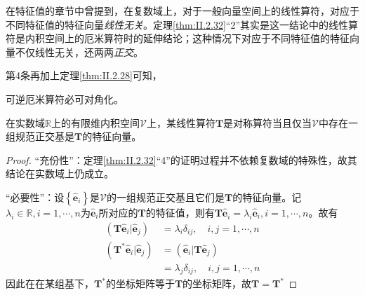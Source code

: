 \documentclass[main.tex]{subfiles}
\begin{document}
在特征值的章节中曾提到，在复数域上，对于一般向量空间上的线性算符，对应于不同特征值的特征向量\emph{线性无关}。定理\ref{thm:II.2.32}“2”其实是这一结论中的线性算符是内积空间上的厄米算符时的延伸结论；这种情况下对应于不同特征值的特征向量不仅线性无关，还两两\emph{正交}。

第4条再加上定理\ref{thm:II.2.28}可知，

\begin{corollary}可逆厄米算符必可对角化。\end{corollary}

\begin{corollary}
    在实数域$\mathbb{R}$上的有限维内积空间$\mathcal{V}$上，某线性算符$\mathbf{T}$是对称算符当且仅当$\mathcal{V}$中存在一组规范正交基是$\mathbf{T}$的特征向量。
\end{corollary}
\begin{proof}
    “充份性”：定理\ref{thm:II.2.32}“4”的证明过程并不依赖复数域的特殊性，故其结论在实数域上仍成立。

    “必要性”：设$\left\{\mathbf{\hat{e}}_i\right\}$是$\mathcal{V}$的一组规范正交基且它们是$\mathbf{T}$的特征向量。记$\lambda_i\in\mathbb{R},i=1,\cdots,n$为$\mathbf{\hat{e}}_i$所对应的$\mathbf{T}$的特征值，则有$\mathbf{T\hat{e}}_i=\lambda_i\mathbf{\hat{e}}_i,i=1,\cdots,n$。故有
    \begin{align*}
        \left(\mathbf{T\hat{e}}_i|\mathbf{\hat{e}}_j\right)            & =\lambda_i\delta_{ij},\quad i,j=1,\cdots,n           \\
        \left(\mathbf{T}^*\mathbf{\hat{e}}_i|\mathbf{\hat{e}}_j\right) & =\left(\mathbf{\hat{e}}_i|\mathbf{T\hat{e}}_j\right) \\
                                                                       & =\lambda_j\delta_{ij},\quad i,j=1,\cdots,n
    \end{align*}
    因此在在某组基下，$\mathbf{T}^*$的坐标矩阵等于$\mathbf{T}$的坐标矩阵，故$\mathbf{T}=\mathbf{T}^*$
\end{proof}
\end{document}
